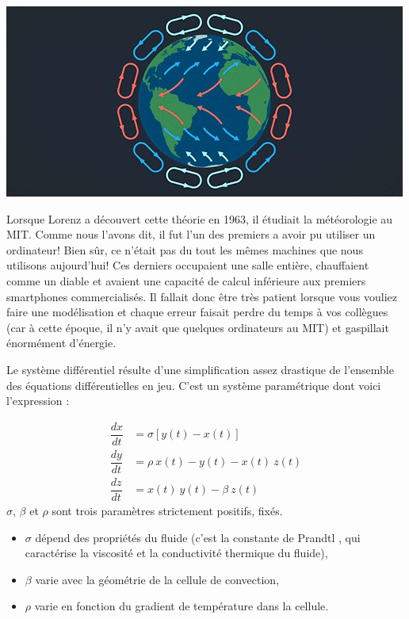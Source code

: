 \documentclass[%
oneside,                 %
final,                   %
10pt]{article}
\begin{document}
\vspace{6mm}

\centerline{\includegraphics[width=0.7\linewidth]{imgs/convection.jpg}}

\vspace{6mm}


Lorsque Lorenz a découvert cette théorie en 1963, il étudiait la météorologie au MIT. Comme nous l'avons dit, il fut l'un des premiers a avoir pu utiliser un ordinateur! Bien sûr, ce n'était pas du tout les mêmes machines que nous utilisons aujourd'hui! Ces derniers occupaient une salle entière, chauffaient comme un diable et avaient une capacité de calcul inférieure aux premiers smartphones commercialisés. Il fallait donc être très patient lorsque vous vouliez faire une modélisation et chaque erreur faisait perdre du temps à vos collègues (car à cette époque, il n'y avait que quelques ordinateurs au MIT) et gaspillait énormément d'énergie.

Le système différentiel résulte d'une simplification assez drastique de l'ensemble des équations différentielles en jeu. C'est un système paramétrique dont voici l'expression :

\begin{align*}
\dfrac{dx}{dt} &=\sigma\left[ y(t)-x(t) \right]\\
\dfrac{dy}{dt} &=\rho \ x(t) - y(t) - x(t) \ z(t)\\
\dfrac{dz}{dt} &=x(t) \ y(t) - \beta \ z(t)
\end{align*}
$\sigma$, $\beta$ et $\rho$ sont trois paramètres strictement positifs, fixés.
\begin{itemize}
\item $\sigma$ dépend des propriétés du fluide (c'est la constante de Prandtl , qui caractérise la viscosité et la conductivité thermique du fluide),

\item $\beta$ varie avec la géométrie de la cellule de convection,

\item $\rho$ varie en fonction du gradient de température dans la cellule.
\end{itemize}
\end{document}
